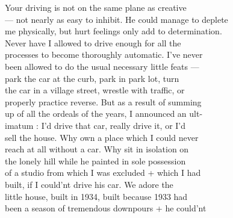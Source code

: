 \documentclass[11pt,a4paper]{article}
\begin{document}
{Your driving is not on the same plane as creative  \\
--- not nearly as easy to inhibit. He could manage to deplete \\
me physically, but hurt feelings only add to determination. \\
Never have I  allowed to drive enough for all the \\
processes to  become thoroughly automatic. I've never \\
been allowed to do the usual necessary little feats --- \\
park the car at the curb, park in park lot, turn \\
the car in a village street, wrestle with traffic, or \\
properly practice reverse. But as a result of summing \\
up of all the ordeals of the years, I announced an ult- \\
imatum : I'd drive that car, really drive it, or I'd \\
sell the house. Why own a place  which I could never \\
reach at all  without a car. Why sit in isolation on \\
the lonely hill while he painted in sole possession \\
of a studio from which I was excluded + which I had \\
built, if I could'nt drive his car. We adore the \\
little house, built in 1934, built because 1933 had \\
been a season of tremendous downpours + he could'nt}






\end{document}
